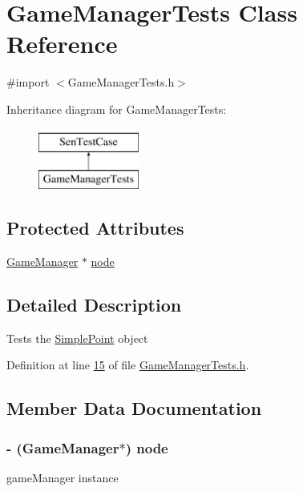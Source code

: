 \hypertarget{interface_game_manager_tests}{\section{Game\-Manager\-Tests Class Reference}
\label{d2/d7d/interface_game_manager_tests}
}


{\ttfamily \#import $<$Game\-Manager\-Tests.\-h$>$}

Inheritance diagram for Game\-Manager\-Tests\-:\begin{figure}[H]
\begin{center}
\leavevmode
\includegraphics[height=2.000000cm]{d2/d7d/interface_game_manager_tests}
\end{center}
\end{figure}
\subsection*{Protected Attributes}
\begin{DoxyCompactItemize}
\item 
\hyperlink{interface_game_manager}{Game\-Manager} $\ast$ \hyperlink{interface_game_manager_tests_af0831d60fcbb503cc3660bc53c5ebb32}{node}
\end{DoxyCompactItemize}


\subsection{Detailed Description}
Tests the \hyperlink{interface_simple_point}{Simple\-Point} object 

Definition at line \hyperlink{_game_manager_tests_8h_source_l00015}{15} of file \hyperlink{_game_manager_tests_8h_source}{Game\-Manager\-Tests.\-h}.



\subsection{Member Data Documentation}
\hypertarget{interface_game_manager_tests_af0831d60fcbb503cc3660bc53c5ebb32}{
\subsubsection[{node}]{\setlength{\rightskip}{0pt plus 5cm}-\/ ({\bf Game\-Manager}$\ast$) node\hspace{0.3cm}{\ttfamily [protected]}}}\label{d2/d7d/interface_game_manager_tests_af0831d60fcbb503cc3660bc53c5ebb32}
game\-Manager instance 


